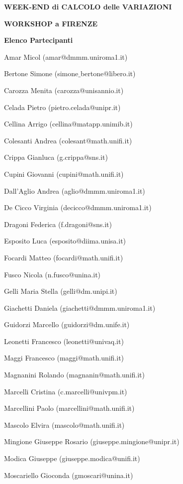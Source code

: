 \documentclass[12pt]{article}
\begin{document}
\centerline{\large{\bf{WEEK-END di CALCOLO delle VARIAZIONI}}}
\vspace*{0.035truein}
\centerline{\large{\bf WORKSHOP a FIRENZE}}
\vspace*{0.035truein}
\centerline{\small{\bf Elenco Partecipanti}}
\vspace*{0.25truein}
%
%


Amar Micol (amar@dmmm.uniroma1.it)

Bertone Simone (simone$\_$bertone@libero.it)

Carozza Menita (carozza@unisannio.it)

Celada Pietro  (pietro.celada@unipr.it)

Cellina Arrigo  (cellina@matapp.unimib.it)

Colesanti Andrea (colesant@math.unifi.it)

Crippa Gianluca (g.crippa@sns.it)

Cupini Giovanni (cupini@math.unifi.it)

Dall'Aglio Andrea (aglio@dmmm.uniroma1.it)

De Cicco Virginia (decicco@dmmm.uniroma1.it)

Dragoni Federica (f.dragoni@sns.it) 

Esposito Luca  (esposito@diima.unisa.it)

Focardi Matteo (focardi@math.unifi.it)

Fusco Nicola (n.fusco@unina.it)

Gelli Maria Stella (gelli@dm.unipi.it)

Giachetti Daniela (giachetti@dmmm.uniroma1.it)

Guidorzi Marcello (guidorzi@dm.unife.it)

Leonetti Francesco (leonetti@univaq.it)

Maggi Francesco (maggi@math.unifi.it)

Magnanini Rolando (magnanin@math.unifi.it)

Marcelli Cristina (c.marcelli@univpm.it)

Marcellini Paolo (marcellini@math.unifi.it)

Mascolo Elvira (mascolo@math.unifi.it)

Mingione Giuseppe Rosario (giuseppe.mingione@unipr.it)

Modica Giuseppe (giuseppe.modica@unifi.it)

Moscariello Gioconda (gmoscari@unina.it)
\end{document}
